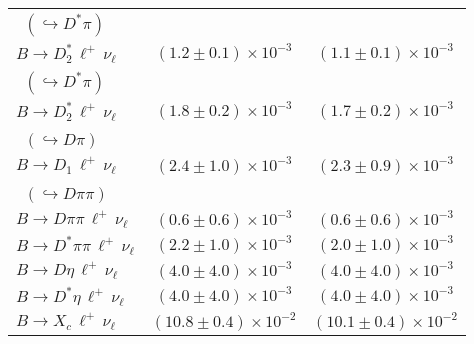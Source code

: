 \documentclass[twocolumn,aps,prd,superscriptaddress,nofootinbib,floatfix,preprintnumbers,a4]{revtex4-1}
\begin{document}
\begin{table}[t!]
\begin{tabular}{lcc}
  \quad\, $(\hookrightarrow D^* \pi)$ \\
  \quad $B \to D_2^* \, \ell^+ \, \nu_\ell$  & $\left(1.2 \pm 0.1\right) \times 10^{-3}$ & $\left(1.1 \pm 0.1\right) \times 10^{-3}$   \\
  \quad\, $(\hookrightarrow D^* \pi)$ \\ 
    \quad $B \to D_2^* \, \ell^+ \, \nu_\ell$  & $\left(1.8 \pm 0.2\right) \times 10^{-3}$ & $\left(1.7 \pm 0.2\right) \times 10^{-3}$   \\
  \quad\, $(\hookrightarrow D \pi)$ \\ 
    \quad $B \to D_1 \, \ell^+ \, \nu_\ell$ &  $\left(2.4 \pm 1.0\right) \times 10^{-3}$ & $\left(2.3 \pm 0.9\right) \times 10^{-3}$  \\
  \quad\, $(\hookrightarrow D \pi \pi)$ \\
   \quad $B \to D \pi \pi \, \ell^+ \, \nu_\ell$ & $\left(0.6 \pm 0.6 \right) \times 10^{-3}$ & $\left(0.6 \pm 0.6 \right) \times 10^{-3}$  \\
   \quad $B \to D^* \pi \pi \, \ell^+ \, \nu_\ell$ & $\left(2.2 \pm 1.0 \right) \times 10^{-3}$ & $\left(2.0 \pm 1.0 \right) \times 10^{-3}$  \\
   \quad $B \to D \eta \, \ell^+ \, \nu_\ell$ & $\left(4.0 \pm 4.0 \right) \times 10^{-3}$ & $\left(4.0 \pm 4.0 \right) \times 10^{-3}$  \\
   \quad $B \to D^{*} \eta \, \ell^+ \, \nu_\ell$ & $\left(4.0 \pm 4.0 \right) \times 10^{-3}$ & $\left(4.0 \pm 4.0 \right) \times 10^{-3}$  \\
     \hline
   \quad $B \to X_c \, \ell^+ \, \nu_\ell$ & $\left(10.8 \pm 0.4\right) \times 10^{-2} $ & $\left(10.1 \pm 0.4\right) \times 10^{-2} $ \\
 \hline\hline
\end{tabular}
\end{table}
\end{document}
